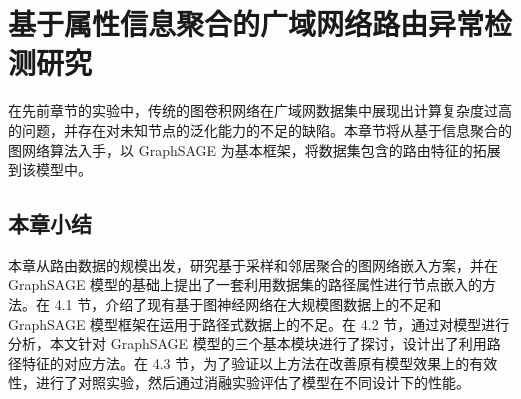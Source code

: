 \chapter{基于属性信息聚合的广域网络路由异常检测研究}

在先前章节的实验中，传统的图卷积网络在广域网数据集中展现出计算复杂度过高的问题，并存在对未知节点的泛化能力的不足的缺陷。本章节将从基于信息聚合的图网络算法入手，以 GraphSAGE 为基本框架，将数据集包含的路由特征的拓展到该模型中。








\section{本章小结}
本章从路由数据的规模出发，研究基于采样和邻居聚合的图网络嵌入方案，并在 GraphSAGE 模型的基础上提出了一套利用数据集的路径属性进行节点嵌入的方法。在 4.1 节，介绍了现有基于图神经网络在大规模图数据上的不足和 GraphSAGE 模型框架在运用于路径式数据上的不足。在 4.2 节，通过对模型进行分析，本文针对 GraphSAGE 模型的三个基本模块进行了探讨，设计出了利用路径特征的对应方法。在 4.3 节，为了验证以上方法在改善原有模型效果上的有效性，进行了对照实验，然后通过消融实验评估了模型在不同设计下的性能。